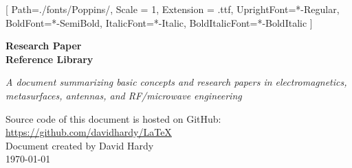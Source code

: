 \documentclass[14pt]{extreport}
\begin{document}
\setsansfont{Poppins}[
    Path=./fonts/Poppins/,
    Scale = 1,
    Extension = .ttf,
    UprightFont=*-Regular,
    BoldFont=*-SemiBold,
    ItalicFont=*-Italic,
    BoldItalicFont=*-BoldItalic
    ]

\thispagestyle{empty}
\begin{titlepage}
    \centering
    \vspace*{4cm}
    {\Huge\bfseries\sffamily Research Paper \\ Reference Library \par}
    \vspace{0.5cm}
    {\large \textsl{A document summarizing basic concepts and research papers in electromagnetics, metasurfaces, antennas, and RF/microwave engineering} \par}
    \vfill
    {Source code of this document is hosted on GitHub:} \\
    \url{https://github.com/davidhardy/LaTeX} \\[1cm]
    {Document created by David Hardy} \\ 
    {\today} 
\end{titlepage}

\tableofcontents
\thispagestyle{empty}

\clearpage
{}







\renewcommand*{\bibfont}{\small}
\printbibliography
\end{document}
